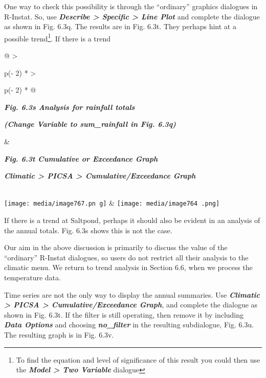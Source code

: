 \documentclass[
  letterpaper,
  DIV=11,
  numbers=noendperiod]{scrreprt}
\begin{document}
One way to check this possibility is through the ``ordinary'' graphics
dialogues in R-Instat. So, use \textbf{\emph{Describe \textgreater{}
Specific \textgreater{} Line Plot}} and complete the dialogue as shown
in Fig. 6.3q. The results are in Fig. 6.3t. They perhaps hint at a
possible trend\footnote{To find the equation and level of significance
  of this result you could then use the \textbf{\emph{Model
  \textgreater{} Two Variable}} dialogue}. If there is a trend

\begin{longtable}[]{@{}
  >{\raggedright\arraybackslash}p{(\columnwidth - 2\tabcolsep) * }
  >{\raggedright\arraybackslash}p{(\columnwidth - 2\tabcolsep) * }@{}}
\toprule\noalign{}
\begin{minipage}[b]{\linewidth}\raggedright
\textbf{\emph{Fig. 6.3s Analysis for rainfall totals}}

\textbf{\emph{(Change Variable to sum\_rainfall in Fig. 6.3q)}}
\end{minipage} & \begin{minipage}[b]{\linewidth}\raggedright
\textbf{\emph{Fig. 6.3t Cumulative or Exceedance Graph}}

\textbf{\emph{Climatic \textgreater{} PICSA \textgreater{}
Cumulative/Exceedance Graph}}
\end{minipage} \\
\midrule\noalign{}
\endhead
\bottomrule\noalign{}
\endlastfoot
\texttt{[image: media/image767.pn g]}
&
\texttt{[image: media/image764 .png]} \\
\end{longtable}

If there is a trend at Saltpond, perhaps it should also be evident in an
analysis of the annual totals. Fig. 6.3s shows this is not the case.

Our aim in the above discussion is primarily to discuss the value of the
``ordinary'' R-Instat dialogues, so users do not restrict all their
analysis to the climatic menu. We return to trend analysis in Section
6.6, when we process the temperature data.

Time series are not the only way to display the annual summaries. Use
\textbf{\emph{Climatic \textgreater{} PICSA \textgreater{}
Cumulative/Exceedance Graph}}, and complete the dialogue as shown in
Fig. 6.3t. If the filter is still operating, then remove it by including
\textbf{\emph{Data Options}} and choosing \textbf{\emph{no\_filter}} in
the resulting subdialogue, Fig. 6.3u. The resulting graph is in Fig.
6.3v.
\end{document}

